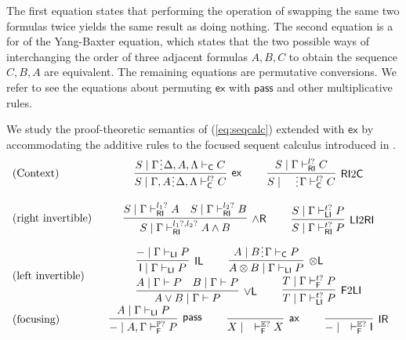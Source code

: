 \documentclass[submission,copyright,creativecommons]{eptcs}
\theoremstyle{definition}
\newcommand{\tl}{\otimes \mathsf{L}}
\newcommand{\pass}{\mathsf{pass}}
\newcommand{\unitl}{\mathsf{IL}}
\newcommand{\unitr}{\mathsf{IR}}
\newcommand{\andr}{\land \mathsf{R}}
\newcommand{\orl}{\lor \mathsf{L}}
\newcommand{\ax}{\mathsf{ax}}
\newcommand{\ot}{\otimes}
\newcommand{\I}{\mathsf{I}}
\newcommand{\C}{\mathsf{C}}
\newcommand{\RI}{\mathsf{RI}}
\newcommand{\LI}{\mathsf{LI}}
\newcommand{\F}{\mathsf{F}}
\newcommand{\tP}{\mathbb{P}}
\newcommand{\tE}{\mathbb{E}}
\newcommand{\ex}{\mathsf{ex}}
\newcommand{\spl}{\raisebox{-1.5pt}[0.5\height]{\hspace{1pt}\vdots\hspace{1pt}}}
\newcommand{\proofbox}[1]{\begin{tabular}{l} #1 \end{tabular}}
\begin{document}
The first equation states that performing the operation of swapping the same two formulas twice yields the same result as doing nothing.
The second equation is a for of the Yang-Baxter equation, which states that the two possible ways of interchanging the order of three adjacent formulas $A , B , C$ to obtain the sequence $C , B , A$ are equivalent.
The remaining equations are permutative conversions.
We refer \cite{veltri:coherence:2021} to see the equations about permuting $\ex$ with $\pass$ and other multiplicative rules. 

We study the proof-theoretic semantics of (\ref{eq:seqcalc}) extended with $\ex$ by accommodating the additive rules to the focused sequent calculus introduced in \cite{veltri:coherence:2021}.
\begin{equation}\label{eq:focus:sym}
  \begin{array}{lc}
    \text{(Context)} &
    \proofbox{
      \infer[\ex]{S \mid \Gamma , A \spl \Delta , \Lambda \vdash^{l?}_{\C} C}{S \mid \Gamma \spl \Delta , A , \Lambda \vdash_{\C} C}
      \qquad
      \infer[\RI 2 \C]{S \mid \quad \spl \Gamma \vdash^{l?}_{\C} C}{S \mid \Gamma \vdash^{l?}_{\RI} C}
    }
    \\[20pt]
    \text{(right invertible)} & %
    \proofbox{
      \infer[\andr]{S \mid \Gamma \vdash^{l_1?, l_2?}_{\RI} A \land B}{
        S \mid \Gamma \vdash^{l_1?}_{\RI} A
        &
        S \mid \Gamma \vdash^{l_2?}_{\RI} B
      }
    \qquad
    \infer[\LI 2 \RI]{S \mid \Gamma \vdash^{t?}_{\RI} P}{S \mid \Gamma \vdash^{t?}_{\LI} P}
    }
    \\[20pt]
    \text{(left invertible)} & %
    \proofbox{
      \infer[\unitl]{\I \mid \Gamma \vdash_{\LI} P}{{-} \mid \Gamma \vdash_{\LI} P}
    \qquad
    \infer[\tl]{A \ot B \mid \Gamma \vdash_{\LI} P}{A \mid B \spl \Gamma \vdash_{\C} P}
    \\
    \infer[\orl]{A \lor B \mid \Gamma \vdash P}{
      A \mid \Gamma \vdash P
      &
      B \mid \Gamma \vdash P
    }
    \qquad
    \infer[\F 2 \LI]{T \mid \Gamma \vdash^{t?}_{\LI} P}{T \mid \Gamma \vdash^{t?}_{\F} P}
    }
    \\[20pt]
    \text{(focusing)} &    %
    \proofbox{
    \infer[\pass]{{-} \mid A , \Gamma \vdash^{\tP?}_{\F} P }{
        A \mid \Gamma \vdash_{\LI} P
    }
    \qquad
    \infer[\ax]{X \mid \quad \vdash^{\tE?}_{\F} X}{}
    \qquad
    \infer[\unitr]{{-} \mid \quad \vdash^{\tE?}_{\F} \I}{}
}
\end{array}
\end{equation}
\end{document}

